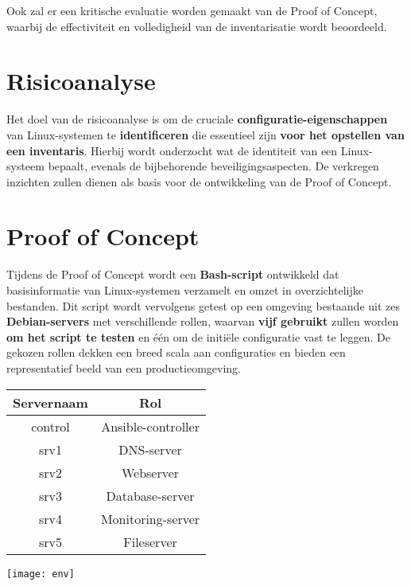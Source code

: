 \documentclass[a0,portrait]{hogent-poster}
\begin{document}
\begin{multicols}{2}
Ook zal er een kritische evaluatie worden gemaakt van de Proof of Concept, waarbij de effectiviteit en volledigheid van de inventarisatie wordt beoordeeld.

\section{Risicoanalyse}

Het doel van de risicoanalyse is om de cruciale \textbf{configuratie-eigenschappen} van Linux-systemen te \textbf{identificeren} die essentieel zijn \textbf{voor het opstellen van een inventaris}.
Hierbij wordt onderzocht wat de identiteit van een Linux-systeem bepaalt, evenals de bijbehorende beveiligingsaspecten.
De verkregen inzichten zullen dienen als basis voor de ontwikkeling van de Proof of Concept.

\section{Proof of Concept}

Tijdens de Proof of Concept wordt een \textbf{Bash-script} ontwikkeld dat basisinformatie van Linux-systemen verzamelt en omzet in overzichtelijke bestanden.
Dit script wordt vervolgens getest op een omgeving bestaande uit zes \textbf{Debian-servers} met verschillende rollen, waarvan \textbf{vijf gebruikt} zullen worden \textbf{om het script te testen} en \'e\'en om de initi\"ele configuratie vast te leggen.
De gekozen rollen dekken een breed scala aan configuraties en bieden een representatief beeld van een productieomgeving.

\begin{center}
  \begin{tabular}{ c c }
    \hline
        Servernaam & Rol \\ [0.5ex]
    \hline
    control & Ansible-controller \\
    srv1    & DNS-server \\
    srv2    & Webserver \\
    srv3    & Database-server \\
    srv4    & Monitoring-server \\
    srv5    & Fileserver \\
  \end{tabular}
\end{center}

\begin{center}
  \captionsetup{type=figure}
  \texttt{[image: env]}
\end{center}


\end{multicols}
\end{document}
